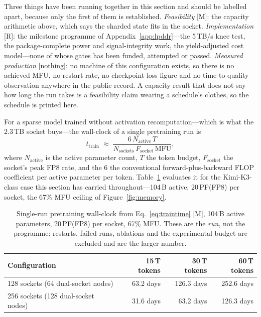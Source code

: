 Three things have been running together in this section and should be labelled apart, because only the first of them is established. \emph{Feasibility} [M]: the capacity arithmetic above, which says the sharded state fits in the socket. \emph{Implementation} [R]: the milestone programme of Appendix~\ref{app:lpddr}---the 5\,TB/s knee test, the package-complete power and signal-integrity work, the yield-adjusted cost model---none of whose gates has been funded, attempted or passed. \emph{Measured production} [nothing]: no machine of this configuration exists, so there is no achieved MFU, no restart rate, no checkpoint-loss figure and no time-to-quality observation anywhere in the public record. A capacity result that does not say how long the run takes is a feasibility claim wearing a schedule's clothes, so the schedule is printed here.

For a sparse model trained without activation recomputation---which is what the 2.3\,TB socket buys---the wall-clock of a single pretraining run is
\begin{equation}
  t_{\text{train}} \;\approx\; \frac{6\,N_{\text{active}}\,T}{N_{\text{sockets}}\,F_{\text{socket}}\,\mathrm{MFU}} ,
  \label{eq:traintime}
\end{equation}
where $N_{\text{active}}$ is the active parameter count, $T$ the token budget, $F_{\text{socket}}$ the socket's peak FP8 rate, and the 6 the conventional forward-plus-backward FLOP coefficient per active parameter per token. Table~\ref{tab:traintime} evaluates it for the Kimi-K3-class case this section has carried throughout---104\,B active, 20\,PF(FP8) per socket, the 67\% MFU ceiling of Figure~\ref{fig:memory}.

\begin{table}[htbp]
  \centering
  \small
  \caption{Single-run pretraining wall-clock from Eq.~\eqref{eq:traintime} [M], 104\,B active parameters, 20\,PF(FP8) per socket, 67\% MFU. These are the \emph{run}, not the programme: restarts, failed runs, ablations and the experimental budget are excluded and are the larger number.}
  \label{tab:traintime}
  \begin{tabular}{lrrr}
    \toprule
    Configuration & 15\,T tokens & 30\,T tokens & 60\,T tokens \\
    \midrule
    128 sockets (64 dual-socket nodes) & 63.2 days & 126.3 days & 252.6 days \\
    256 sockets (128 dual-socket nodes) & 31.6 days & 63.2 days & 126.3 days \\
    \bottomrule
  \end{tabular}
\end{table}

